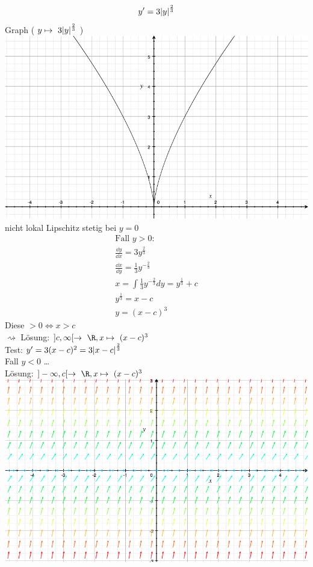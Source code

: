 \begin{bsp}
	\[ y' = 3 \abs{y}^{\frac{2}{3}} \]
	Graph ( $y \mapsto 3 \abs{y}^{\frac{2}{3}}$ ) \\
	\includegraphics[width=\textwidth]{Bild3} \\
	nicht lokal Lipschitz stetig bei $y=0$
	\begin{gather*}
		\text{Fall } y>0 : \\
		\frac{\dd y}{\dd x} = 3 y^{\frac{2}{3}} \\
		\frac{\dd x}{\dd y} = \frac{1}{3} y^{-\frac{2}{3}} \\
		x = \int \frac{1}{3} y^{-\frac{2}{3}} dy = y^{\frac{1}{3}} + c \\
		y^{\frac{1}{3}} = x - c \\
		y = (x-c)^3
	\end{gather*}
	Diese $> 0 \iff x > c$ \\
	$\rightsquigarrow$ Lösung: $]c , \infty[ \rightarrow \R , x \mapsto (x-c)^3$ \\
	Test: $y' = 3(x-c)^2 = 3 \abs{x-c}^{\frac{2}{3}}$ \\
	Fall $y<0$ \dots \\
	Lösung: $] -\infty , c [ \rightarrow \R , x \mapsto (x-c)^3$
	\includegraphics[width=\textwidth]{Bild4} \\

\end{bsp}
